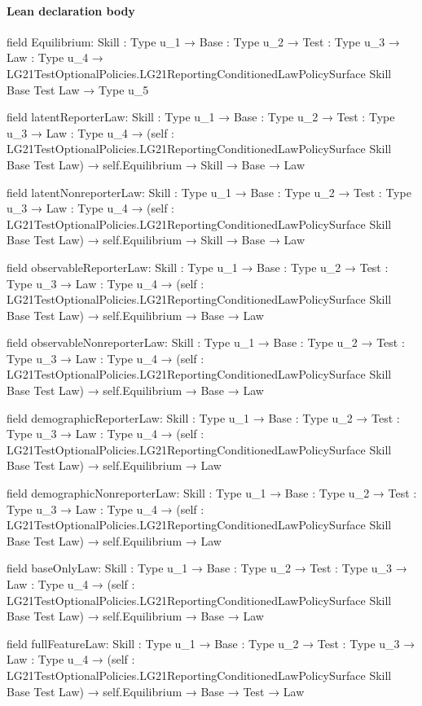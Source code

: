 \documentclass[10pt]{article}
\begin{document}
\paragraph{Lean declaration body}
\begin{ReviewVerbatim}
field Equilibrium:
{Skill : Type u_1} →
  {Base : Type u_2} →
    {Test : Type u_3} →
      {Law : Type u_4} →
        LG21TestOptionalPolicies.LG21ReportingConditionedLawPolicySurface Skill Base Test Law → Type u_5

field latentReporterLaw:
{Skill : Type u_1} →
  {Base : Type u_2} →
    {Test : Type u_3} →
      {Law : Type u_4} →
        (self : LG21TestOptionalPolicies.LG21ReportingConditionedLawPolicySurface Skill Base Test Law) →
          self.Equilibrium → Skill → Base → Law

field latentNonreporterLaw:
{Skill : Type u_1} →
  {Base : Type u_2} →
    {Test : Type u_3} →
      {Law : Type u_4} →
        (self : LG21TestOptionalPolicies.LG21ReportingConditionedLawPolicySurface Skill Base Test Law) →
          self.Equilibrium → Skill → Base → Law

field observableReporterLaw:
{Skill : Type u_1} →
  {Base : Type u_2} →
    {Test : Type u_3} →
      {Law : Type u_4} →
        (self : LG21TestOptionalPolicies.LG21ReportingConditionedLawPolicySurface Skill Base Test Law) →
          self.Equilibrium → Base → Law

field observableNonreporterLaw:
{Skill : Type u_1} →
  {Base : Type u_2} →
    {Test : Type u_3} →
      {Law : Type u_4} →
        (self : LG21TestOptionalPolicies.LG21ReportingConditionedLawPolicySurface Skill Base Test Law) →
          self.Equilibrium → Base → Law

field demographicReporterLaw:
{Skill : Type u_1} →
  {Base : Type u_2} →
    {Test : Type u_3} →
      {Law : Type u_4} →
        (self : LG21TestOptionalPolicies.LG21ReportingConditionedLawPolicySurface Skill Base Test Law) →
          self.Equilibrium → Law

field demographicNonreporterLaw:
{Skill : Type u_1} →
  {Base : Type u_2} →
    {Test : Type u_3} →
      {Law : Type u_4} →
        (self : LG21TestOptionalPolicies.LG21ReportingConditionedLawPolicySurface Skill Base Test Law) →
          self.Equilibrium → Law

field baseOnlyLaw:
{Skill : Type u_1} →
  {Base : Type u_2} →
    {Test : Type u_3} →
      {Law : Type u_4} →
        (self : LG21TestOptionalPolicies.LG21ReportingConditionedLawPolicySurface Skill Base Test Law) →
          self.Equilibrium → Base → Law

field fullFeatureLaw:
{Skill : Type u_1} →
  {Base : Type u_2} →
    {Test : Type u_3} →
      {Law : Type u_4} →
        (self : LG21TestOptionalPolicies.LG21ReportingConditionedLawPolicySurface Skill Base Test Law) →
          self.Equilibrium → Base → Test → Law
\end{ReviewVerbatim}
\end{document}
